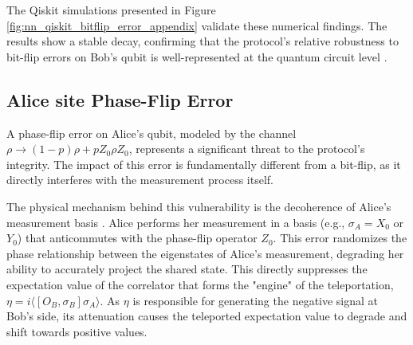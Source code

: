 The Qiskit simulations presented in Figure \ref{fig:nn_qiskit_bitflip_error_appendix} validate these numerical findings. The results show a stable decay, confirming that the protocol's relative robustness to bit-flip errors on Bob's qubit is well-represented at the quantum circuit level \cite{Lo2005, Wang2005}.

\subsection{Alice site Phase-Flip Error}



A phase-flip error on Alice's qubit, modeled by the channel $\rho \rightarrow (1-p)\rho + pZ_{0}\rho Z_{0}$, represents a significant threat to the protocol's integrity. The impact of this error is fundamentally different from a bit-flip, as it directly interferes with the measurement process itself.

The physical mechanism behind this vulnerability is the decoherence of Alice's measurement basis \cite{QKDbyQET, Lydersen2010, Zhao2008}. Alice performs her measurement in a basis (e.g., $\sigma_A = X_0$ or $Y_0$) that anticommutes with the phase-flip operator $Z_0$. This error randomizes the phase relationship between the eigenstates of Alice's measurement, degrading her ability to accurately project the shared state. This directly suppresses the expectation value of the correlator that forms the "engine" of the teleportation, $\eta = i\langle[O_B, \sigma_B]\sigma_A\rangle$. As $\eta$ is responsible for generating the negative signal at Bob's side, its attenuation causes the teleported expectation value to degrade and shift towards positive values.

